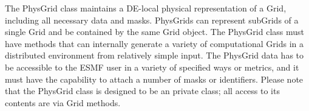 The PhysGrid class maintains a DE-local physical representation of a Grid,
including all necessary data and masks.  PhysGrids can represent subGrids
of a single Grid and be contained by the same Grid object. The PhysGrid
class must have methods that can internally generate a variety of
computational Grids in a distributed environment from relatively simple
input.  The PhysGrid data has to be accessible to the ESMF user in a
variety of specified ways or metrics, and it must have the capability to
attach a number of masks or identifiers.  Please note that the PhysGrid class
is designed to be an private class; all access to its contents are via
Grid methods.


